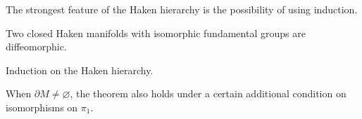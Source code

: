 \documentclass{../../small}
\begin{document}
The strongest feature of the Haken hierarchy is the possibility of using induction.

\begin{thm}[Waldhausen]
Two closed Haken manifolds with isomorphic fundamental groups are diffeomorphic.
\end{thm}
\begin{pf}
Induction on the Haken hierarchy.
\end{pf}

\begin{rmk*}
When $\partial M\ne\varnothing$, the theorem also holds under a certain additional condition on isomorphisms on $\pi_1$.
\end{rmk*}
\end{document}
